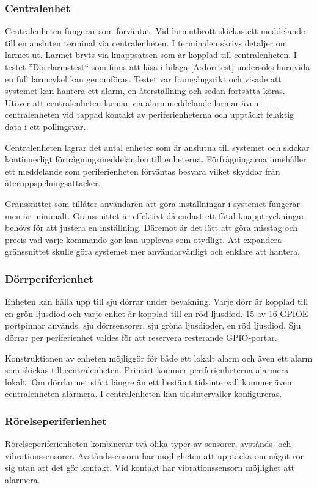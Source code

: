 \documentclass[a4paper]{article}
\begin{document}
\subsubsection{Centralenhet}
Centralenheten fungerar som förväntat.
Vid larmutbrott skickas ett meddelande till en ansluten terminal via centralenheten.
I terminalen skrivs detaljer om larmet ut.
Larmet bryts via knappsatsen som är kopplad till centralenheten.
I testet ''Dörrlarmstest`` som finns att läsa i bilaga \ref{A:dörrtest} undersöks huruvida en full larmcykel kan genomföras.
Testet var framgångsrikt och visade att systemet kan hantera ett alarm, en återställning och sedan fortsätta köras.
Utöver att centralenheten larmar via alarmmeddelande larmar även centralenheten vid tappad kontakt av periferienheterna och upptäckt felaktig data i ett pollingsvar.

Centralenheten lagrar det antal enheter som är anslutna till systemet och skickar kontinuerligt förfrågningsmeddelanden till enheterna.
Förfrågningarna innehåller ett meddelande som periferienheten förväntas besvara vilket skyddar från återuppspelningsattacker.

Gränssnittet som tillåter användaren att göra inställningar i systemet fungerar men är minimalt.
Gränssnittet är effektivt då endast ett fåtal knapptryckningar behövs för att justera en inställning.
Däremot är det lätt att göra misstag och precis vad varje kommando gör kan upplevas som otydligt.
Att expandera gränssnittet skulle göra systemet mer användarvänligt och enklare att hantera.

\subsubsection{Dörrperiferienhet}
Enheten kan hålla upp till sju dörrar under bevakning.
Varje dörr är kopplad till en grön ljusdiod och varje enhet är kopplad till en röd ljusdiod.
15 av 16 GPIOE-portpinnar används, sju dörrsensorer, sju gröna ljusdioder, en röd ljusdiod.
Sju dörrar per periferienhet valdes för att reservera resterande GPIO-portar.

Konstruktionen av enheten möjliggör för både ett lokalt alarm och även ett alarm som skickas till centralenheten.
Primärt kommer periferienheterna alarmera lokalt.
Om dörrlarmet stått längre än ett bestämt tidsintervall kommer även centralenheten alarmera.
I centralenheten kan tidsintervaller konfigureras.

\subsubsection{Rörelseperiferienhet}
Rörelseperiferienheten kombinerar två olika typer av sensorer, avstånds- och vibrationssensorer.
Avståndssensorn har möjligheten att upptäcka om något rör sig utan att det gör kontakt.
Vid kontakt har vibrationssensorn möjlighet att alarmera.
\end{document}
